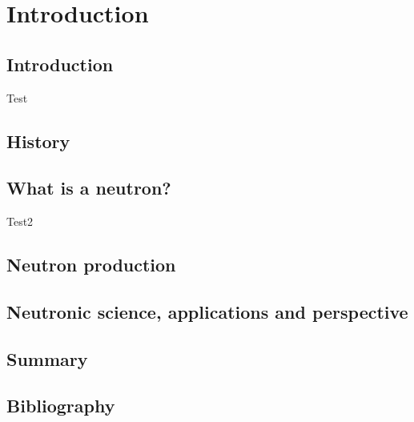 \chapter{Introduction}
\cleardoublepage

\minitoc

\section{Introduction}
\begin{refsection}
	\label{ch1:Introduction}
	Test \cite{Mason2005}

	\section{History}

	\section{What is a neutron?}
	\label{ch1:s:Neutron}
	Test2 \cite{osti_656719}

	\section{Neutron production}

	\section{Neutronic science, applications and perspective}

	\section{Summary}
	\label{ch1:Summary}

	\cleardoublepage
	\section{Bibliography}
	\label{ch1:bib}
	\printbibliography[heading=subbibliography]
\end{refsection}